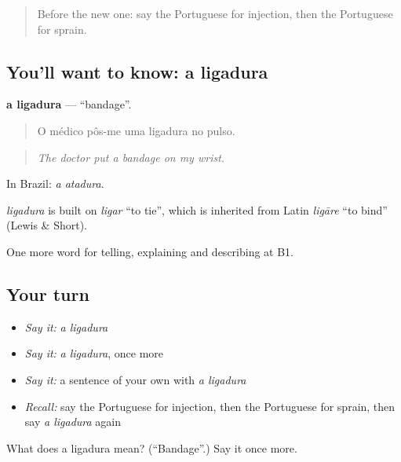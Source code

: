 \label{lesson:PT-C486-ligadura}



\begin{quote}
Before the new one: say the Portuguese for injection, then the Portuguese for sprain.
\end{quote}

\subsection*{You'll want to know: a ligadura}
\textbf{a ligadura} — \textquotedblleft{}bandage\textquotedblright{}.

\begin{quote}
O médico pôs-me uma ligadura no pulso.
\end{quote}

\begin{quote}
\emph{The doctor put a bandage on my wrist.}
\end{quote}

In Brazil: \emph{a atadura}.

\begin{cousinweb}
\emph{ligadura} is built on \emph{ligar} \textquotedblleft{}to tie\textquotedblright{}, which is inherited from Latin \emph{ligāre} \textquotedblleft{}to bind\textquotedblright{} (Lewis \& Short).
\end{cousinweb}

\begin{grammarlens}[title={What you've built}]
One more word for telling, explaining and describing at B1.
\end{grammarlens}

\subsection*{Your turn}
\begin{itemize}
\raggedright
  \item \emph{Say it:} \emph{a ligadura}
  \item \emph{Say it:} \emph{a ligadura}, once more
  \item \emph{Say it:} a sentence of your own with \emph{a ligadura}
  \item \emph{Recall:} say the Portuguese for injection, then the Portuguese for sprain, then say \emph{a ligadura} again
\end{itemize}

\begin{tcolorbox}[breakable,colback=teal!4,colframe=teal!35!black,title={Before you move on}]
What does a ligadura mean? (\textquotedblleft{}Bandage\textquotedblright{}.) Say it once more.
\end{tcolorbox}
